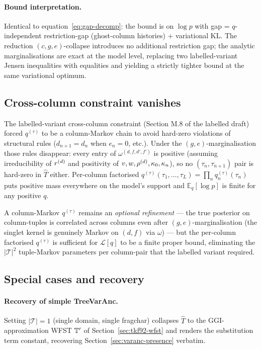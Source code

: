 \paragraph{Bound interpretation.}
Identical to equation~\eqref{eq:gap-decomp}: the bound is on
$\log p$ with gap = $q$-independent restriction-gap (ghost-column
histories) + variational KL. The reduction $(c, g, e)$-collapse
introduces no additional restriction gap; the analytic
marginalisations are exact at the model level, replacing two
labelled-variant Jensen inequalities with equalities and yielding a
strictly tighter bound at the same variational optimum.

\subsection{Cross-column constraint vanishes}
\label{sec:varanc-mixdom-cross-column-vanishes}

The labelled-variant cross-column constraint (Section M.8 of the
labelled draft) forced $q^{(\tau)}$ to be a column-Markov chain to
avoid hard-zero violations of structural rules
($d_{n+1} = d_n$ when $e_n = 0$, etc.). Under the
$(g, e)$-marginalisation those rules disappear: every entry of
$\omega^{(d, f, d', f')}$ is positive (assuming irreducibility of
$r^{(d)}$ and positivity of $v, w, \rho^{(d)},
\kappa_{0}, \kappa_{n}$), so no $(\tau_n, \tau_{n+1})$ pair
is hard-zero in $\hat{T}$ either. Per-column factorised
$q^{(\tau)}(\tau_1, \ldots, \tau_L) = \prod_n q^{(\tau)}_n(\tau_n)$
puts positive mass everywhere on the model's support and
$\mathbb{E}_q[\log p]$ is finite for any positive $q$.

A column-Markov $q^{(\tau)}$ remains an \emph{optional refinement} —
the true posterior on column-tuples is correlated across columns
even after $(g, e)$-marginalisation (the singlet kernel is genuinely
Markov on $(d, f)$ via $\omega$) — but the per-column factorised
$q^{(\tau)}$ is sufficient for $\mathcal{L}[q]$ to be a finite
proper bound, eliminating the $|\mathcal{T}|^2$ tuple-Markov
parameters per column-pair that the labelled variant required.

\subsection{Special cases and recovery}
\label{sec:varanc-mixdom-reduced-special-cases}

\paragraph{Recovery of simple TreeVarAnc.}
Setting $|\mathcal{T}| = 1$ (single domain, single fragchar) collapses
$\hat{T}$ to the GGI-approximation WFST
$\mathbb{T}'$ of Section~\ref{sec:tkf92-wfst} and renders the
substitution term constant, recovering Section~\ref{sec:varanc-presence}
verbatim.


